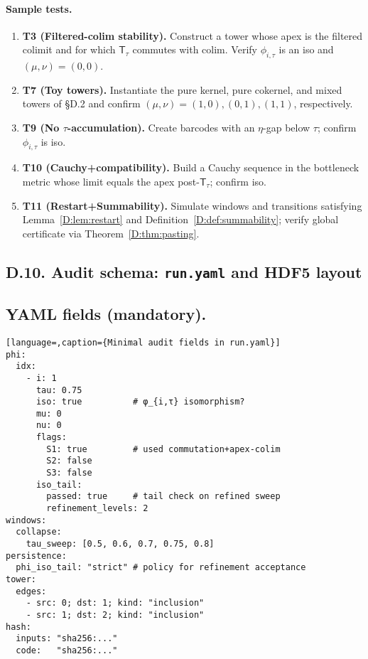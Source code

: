 \documentclass[11pt]{article}
\numberwithin{equation}{section}
\theoremstyle{plain}
\theoremstyle{definition}
\theoremstyle{remark}
\newcommand{\T}{\mathsf{T}}
\theoremstyle{plain}
\theoremstyle{definition}
\numberwithin{equation}{section}
\theoremstyle{definition}
\numberwithin{equation}{section}
\theoremstyle{plain}
\theoremstyle{definition}
\theoremstyle{remark}
\begin{document}
\paragraph{Sample tests.}
\begin{enumerate}[label=({T}\arabic*)]
\item \textbf{T3 (Filtered-colim stability).} Construct a tower whose apex is the filtered colimit and for which \(\T_\tau\) commutes with colim. Verify \(\phi_{i,\tau}\) is an iso and \((\mu,\nu)=(0,0)\).
\item \textbf{T7 (Toy towers).} Instantiate the pure kernel, pure cokernel, and mixed towers of §D.2 and confirm \((\mu,\nu)=(1,0),(0,1),(1,1)\), respectively.
\item \textbf{T9 (No \(\tau\)-accumulation).} Create barcodes with an \(\eta\)-gap below \(\tau\); confirm \(\phi_{i,\tau}\) is iso.
\item \textbf{T10 (Cauchy+compatibility).} Build a Cauchy sequence in the bottleneck metric whose limit equals the apex post-\(\T_\tau\); confirm iso.
\item \textbf{T11 (Restart+Summability).} Simulate windows and transitions satisfying Lemma~\ref{D:lem:restart} and Definition~\ref{D:def:summability}; verify global certificate via Theorem~\ref{D:thm:pasting}.
\end{enumerate}

\subsection*{D.10. Audit schema: \texttt{run.yaml} and HDF5 layout}\label{subsec:D-audit}

\subsection*{YAML fields (mandatory).}
\begin{lstlisting}[language=,caption={Minimal audit fields in run.yaml}]
phi:
  idx:
    - i: 1
      tau: 0.75
      iso: true          # φ_{i,τ} isomorphism?
      mu: 0
      nu: 0
      flags:
        S1: true         # used commutation+apex-colim
        S2: false
        S3: false
      iso_tail:
        passed: true     # tail check on refined sweep
        refinement_levels: 2
windows:
  collapse:
    tau_sweep: [0.5, 0.6, 0.7, 0.75, 0.8]
persistence:
  phi_iso_tail: "strict" # policy for refinement acceptance
tower:
  edges:
    - src: 0; dst: 1; kind: "inclusion"
    - src: 1; dst: 2; kind: "inclusion"
hash:
  inputs: "sha256:..."
  code:   "sha256:..."
\end{lstlisting}
\end{document}
